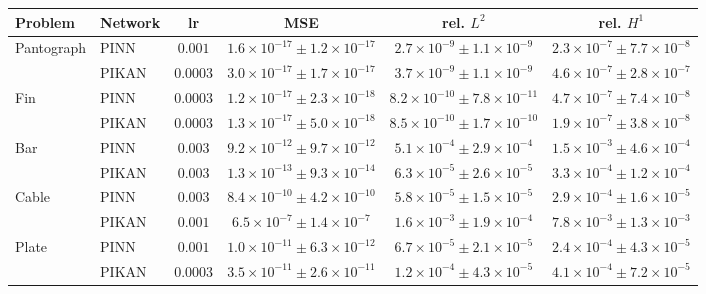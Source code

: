 \begin{tabular}{llcccc}
\toprule
Problem & Network & lr & MSE & rel. $L^2$ & rel. $H^1$\\
\midrule
Pantograph & PINN & $0.001$ & $1.6{\times}10^{-17}\pm1.2{\times}10^{-17}$ & $2.7{\times}10^{-9}\pm1.1{\times}10^{-9}$ & $2.3{\times}10^{-7}\pm7.7{\times}10^{-8}$\\
 & PIKAN & $0.0003$ & $3.0{\times}10^{-17}\pm1.7{\times}10^{-17}$ & $3.7{\times}10^{-9}\pm1.1{\times}10^{-9}$ & $4.6{\times}10^{-7}\pm2.8{\times}10^{-7}$\\
\addlinespace
Fin & PINN & $0.0003$ & $1.2{\times}10^{-17}\pm2.3{\times}10^{-18}$ & $8.2{\times}10^{-10}\pm7.8{\times}10^{-11}$ & $4.7{\times}10^{-7}\pm7.4{\times}10^{-8}$\\
 & PIKAN & $0.0003$ & $1.3{\times}10^{-17}\pm5.0{\times}10^{-18}$ & $8.5{\times}10^{-10}\pm1.7{\times}10^{-10}$ & $1.9{\times}10^{-7}\pm3.8{\times}10^{-8}$\\
\addlinespace
Bar & PINN & $0.003$ & $9.2{\times}10^{-12}\pm9.7{\times}10^{-12}$ & $5.1{\times}10^{-4}\pm2.9{\times}10^{-4}$ & $1.5{\times}10^{-3}\pm4.6{\times}10^{-4}$\\
 & PIKAN & $0.003$ & $1.3{\times}10^{-13}\pm9.3{\times}10^{-14}$ & $6.3{\times}10^{-5}\pm2.6{\times}10^{-5}$ & $3.3{\times}10^{-4}\pm1.2{\times}10^{-4}$\\
\addlinespace
Cable & PINN & $0.003$ & $8.4{\times}10^{-10}\pm4.2{\times}10^{-10}$ & $5.8{\times}10^{-5}\pm1.5{\times}10^{-5}$ & $2.9{\times}10^{-4}\pm1.6{\times}10^{-5}$\\
 & PIKAN & $0.001$ & $6.5{\times}10^{-7}\pm1.4{\times}10^{-7}$ & $1.6{\times}10^{-3}\pm1.9{\times}10^{-4}$ & $7.8{\times}10^{-3}\pm1.3{\times}10^{-3}$\\
\addlinespace
Plate & PINN & $0.001$ & $1.0{\times}10^{-11}\pm6.3{\times}10^{-12}$ & $6.7{\times}10^{-5}\pm2.1{\times}10^{-5}$ & $2.4{\times}10^{-4}\pm4.3{\times}10^{-5}$\\
 & PIKAN & $0.0003$ & $3.5{\times}10^{-11}\pm2.6{\times}10^{-11}$ & $1.2{\times}10^{-4}\pm4.3{\times}10^{-5}$ & $4.1{\times}10^{-4}\pm7.2{\times}10^{-5}$\\
\bottomrule
\end{tabular}